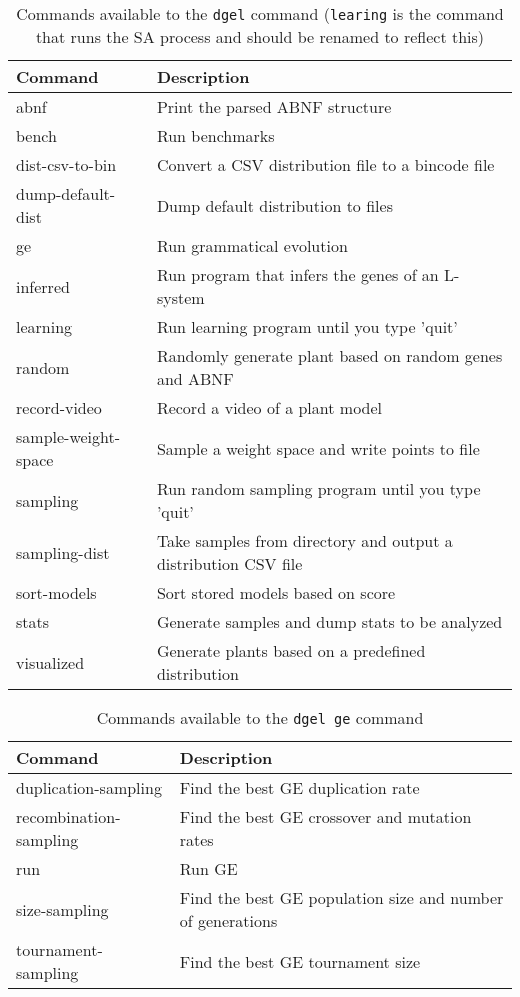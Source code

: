 \begin{table}
    \centering
    \begin{tabularx}{\textwidth}{| l | X |}
    \hline
    Command & Description \\
    \hline
    abnf                  & Print the parsed ABNF structure \\
    bench                 & Run benchmarks \\
    dist-csv-to-bin       & Convert a CSV distribution file to a bincode file \\
    dump-default-dist     & Dump default distribution to files \\
    ge                    & Run grammatical evolution \\
    inferred              & Run program that infers the genes of an L-system \\
    learning              & Run learning program until you type 'quit' \\
    random                & Randomly generate plant based on random genes and ABNF \\
    record-video          & Record a video of a plant model \\
    sample-weight-space   & Sample a weight space and write points to file \\
    sampling              & Run random sampling program until you type 'quit' \\
    sampling-dist         & Take samples from directory and output a distribution CSV file \\
    sort-models           & Sort stored models based on score \\
    stats                 & Generate samples and dump stats to be analyzed \\
    visualized            & Generate plants based on a predefined distribution \\
    \hline
    \end{tabularx}
    \caption[Commands available to the \texttt{dgel} command]{Commands available to the \texttt{dgel} command (\texttt{learing} is the command that runs the \gls{SA} process and should be renamed to reflect this)}
    \label{tab:dgel-cli}
\end{table}

\begin{table}
    \centering
    \begin{tabularx}{\textwidth}{| l | X |}
    \hline
    Command & Description \\
    \hline
    duplication-sampling     & Find the best GE duplication rate \\
    recombination-sampling   & Find the best GE crossover and mutation rates \\
    run                      & Run GE \\
    size-sampling            & Find the best GE population size and number of generations \\
    tournament-sampling      & Find the best GE tournament size \\
    \hline
    \end{tabularx}
    \caption{Commands available to the \texttt{dgel ge} command}
    \label{tab:ge-cli}
\end{table}


